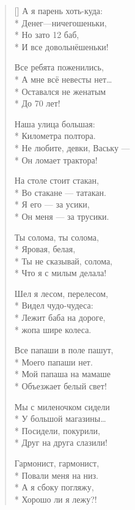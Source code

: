 \documentclass[a4paper,oneside,14pt]{scrbook}
\begin{document}
\begin{verse}[\versewidth]
        А я парень хоть-куда:\\*
        Денег---ничегошеньки,\\*
        Но зато 12 баб,\\*
        И все довольнёшеньки!
        
        Все ребята поженились,\\*
        А мне всё невесты нет\ldots\\*
        Оставался не женатым\\*
        До 70 лет!
        
        Наша улица большая:\\*
        Километра полтора.\\*
        Не любите, девки, Ваську ---\\*
        Он ломает трактора!
        
        На столе стоит стакан,\\*
        Во стакане --- татакан.\\*
        Я его --- за усики,\\*
        Он меня --- за трусики.
        
        Ты солома, ты солома,\\*
        Яровая, белая,\\*
        Ты не сказывай, солома,\\*
        Что я с милым делала!

        Шел я лесом, перелесом,\\*
        Видел чудо-чудеса:\\*
        Лежит баба на дороге,\\* 
        жопа шире колеса.

        Все папаши в поле пашут,\\*
        Моего папаши нет.\\*
        Мой папаша на мамаше\\* 
        Объезжает белый свет!

        Мы с миленочком сидели\\* 
        У большой магазины\ldots\\*
        Посидели, покурили,\\*
        Друг на друга слазили!

        Гармонист, гармонист,\\*
        Повали меня на низ.\\*
        А я сбоку погляжу,\\*
        Хорошо ли я лежу?!
        

\end{verse}
\end{document}
